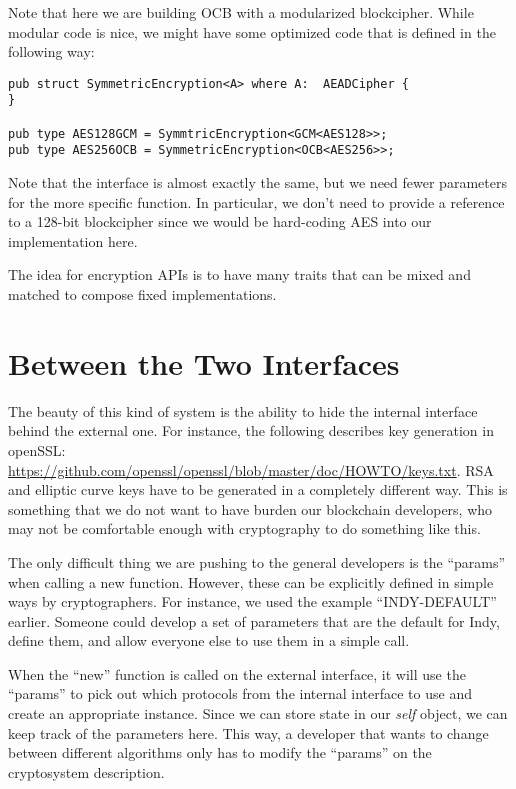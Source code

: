 \documentclass[letterpaper,11pt]{article}
\begin{document}
Note that here we are building OCB with a modularized blockcipher.  While modular code is nice, we might have some optimized code that is defined in the following way:

\begin{verbatim}
pub struct SymmetricEncryption<A> where A:  AEADCipher {
}

pub type AES128GCM = SymmtricEncryption<GCM<AES128>>;
pub type AES256OCB = SymmetricEncryption<OCB<AES256>>;
\end{verbatim}

Note that the interface is almost exactly the same, but we need fewer parameters for the more specific function.  In particular, we don't need to provide a reference to a 128-bit blockcipher since we would be hard-coding AES into our implementation here.

The idea for encryption APIs is to have many traits that can be mixed and matched to compose fixed implementations.

\section{Between the Two Interfaces}
The beauty of this kind of system is the ability to hide the internal interface behind the external one.  For instance, the following describes key generation in openSSL:  \url{https://github.com/openssl/openssl/blob/master/doc/HOWTO/keys.txt}.  RSA and elliptic curve keys have to be generated in a completely different way.  This is something that we do not want to have burden our blockchain developers, who may not be comfortable enough with cryptography to do something like this.

The only difficult thing we are pushing to the general developers is the ``params'' when calling a new function.  However, these can be explicitly defined in simple ways by cryptographers.  For instance, we used the example ``INDY-DEFAULT'' earlier.  Someone could develop a set of parameters that are the default for Indy, define them, and allow everyone else to use them in a simple call.

When the ``new'' function is called on the external interface, it will use the ``params'' to pick out which protocols from the internal interface to use and create an appropriate instance.  Since we can store state in our \emph{self} object, we can keep track of the parameters here.  This way, a developer that wants to change between different algorithms only has to modify the ``params'' on the cryptosystem description. 
\end{document}
